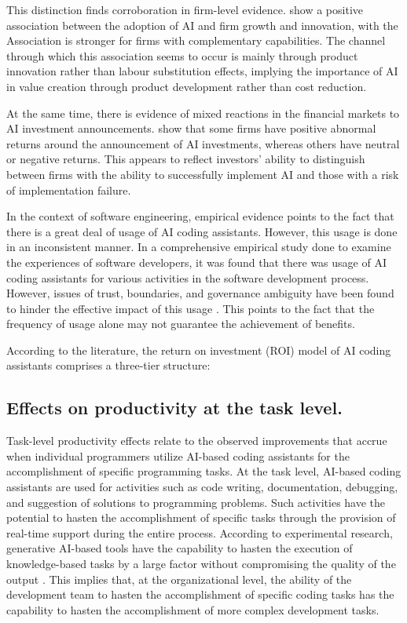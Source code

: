 This distinction finds corroboration in firm-level evidence. \textcite{Babina2024} show a 
positive association between the adoption of AI and firm growth and innovation, with the 
Association is stronger for firms with complementary capabilities. The channel through which this association seems to occur is mainly through product innovation rather than labour substitution effects, implying the importance of AI in value creation through product development rather than cost reduction.

At the same time, there is evidence of mixed reactions in the financial markets to AI 
investment announcements. \textcite{Lui2021} show that some firms have positive abnormal returns around the announcement of AI investments, whereas others have neutral or negative returns. This appears to reflect investors' ability to distinguish between firms with the ability to successfully implement AI and those with a risk of implementation failure.

In the context of software engineering, empirical evidence points to the fact that there is a great deal of usage of AI coding assistants. However, this usage is done in an inconsistent manner. In a comprehensive empirical study done to examine the experiences of software developers, it was found that there was usage of AI coding assistants for various activities in the software development process. However, issues of trust, boundaries, and governance ambiguity have been found to hinder the effective impact of this usage \autocite{Sergeyuk2025}. This points to the fact that the frequency of usage alone may not guarantee the achievement of benefits.

According to the literature, the return on investment (ROI) model of AI coding assistants comprises a three-tier structure:

\subsection {Effects on productivity at the task level.}
\label{sec:Effects on productivity at the task level}
Task-level productivity effects relate to the observed improvements that accrue when individual programmers utilize AI-based coding assistants for the accomplishment of specific programming tasks. At the task level, AI-based coding assistants are used for activities such as code writing, documentation, debugging, and suggestion of solutions to programming problems. Such activities have the potential to hasten the accomplishment of specific tasks through the provision of real-time support during the entire process. According to experimental research, generative AI-based tools have the capability to hasten the execution of knowledge-based tasks by a large factor without compromising the quality of the output \autocite{Noy2023}. This implies that, at the organizational level, the ability of the development team to hasten the accomplishment of specific coding tasks has the capability to hasten the accomplishment of more complex development tasks.

